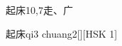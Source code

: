 \begin{entry}{起床}{10,7}{⾛、⼴}
  \begin{phonetics}{起床}{qi3 chuang2}[][HSK 1]
  \end{phonetics}
\end{entry}
